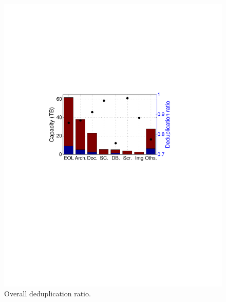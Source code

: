 \begin{figure}[t]
	\centering
	\begin{minipage}{0.22\textwidth}
		\centering
		\includegraphics[width=1\textwidth]{graphs/dedup-overall}
		\caption{Overall deduplication ratio.}
		\label{fig:dedup-overall}
	\end{minipage}
	\begin{minipage}{0.22\textwidth}
		\centering

\end{minipage}
\end{figure}
